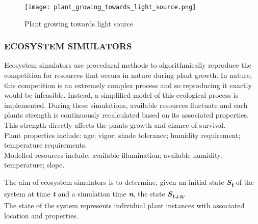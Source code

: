 \begin{figure}[h]
  \centering
	  \label{Plant growing towards light source}
	    \texttt{[image: plant\_growing\_towards\_light\_source.png]}
	\caption{Plant growing towards light source ~\cite{Soler2001} }
\end{figure}

\subsubsection{ECOSYSTEM SIMULATORS}

Ecosystem simulators use procedural methods to algorithmically reproduce the competition for resources that occurs in nature during plant growth. In nature, this competition is an extremely complex process and so reproducing it exactly would be infeasible. Instead, a simplified model of this ecological process is implemented. During these simulations, available resources fluctuate and each plants strength is continuously recalculated based on its associated properties. This strength directly affects the plants growth and chance of survival. \\
Plant properties include: age; vigor; shade tolerance; humidity requirement; temperature
requirements.\\
Modelled resources include: available illumination; available humidity; temperature; slope.

The aim of ecosystem simulators is to determine, given an initial state \textbf{\textit{S\textsubscript{t}}} of the system at time \textbf{\textit{t}} and a simulation time \textbf{\textit{n}}, the state \textbf{\textit{S\textsubscript{t+n}}}. \\
The state of the system represents individual plant instances with associated location and properties. \\

